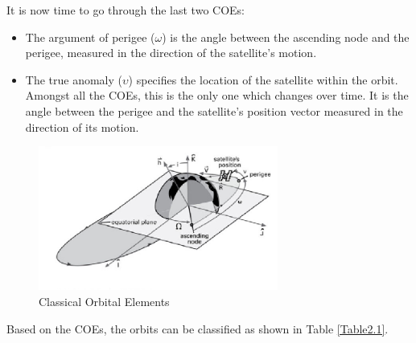 It is now time to go through the last two COEs:
\begin{itemize}
\item The argument of perigee ($\omega$) is the angle between the ascending node and the perigee, measured in the direction of the satellite's motion.
\item The true anomaly ($\upsilon$) specifies the location of the satellite within the orbit. Amongst all the COEs, this is the only one which changes over time. It is the angle between the perigee and the satellite's position vector measured in the direction of its motion.
\end{itemize}

\begin{figure}[H]
\centerline{\includegraphics[width=0.7\textwidth]{images/COEs.png}}
\caption{Classical Orbital Elements \cite{IntAstr}}
\label{f2.3}
\end{figure}

Based on the COEs, the orbits can be classified as shown in Table \ref{Table2.1}.

